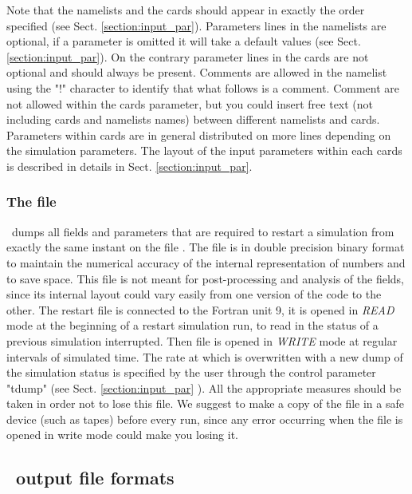 Note that the namelists and the cards should appear in exactly the order
specified (see Sect. \ref{section:input_par}). 
Parameters lines in the namelists are optional, if a parameter is omitted
it will take a default values (see Sect. \ref{section:input_par}).
On the contrary parameter lines in the cards are not optional and
should always be present.
Comments are allowed in the namelist using the "!" character to identify 
that what follows is a comment. Comment are not allowed within the cards
parameter, but you could insert free text (not including cards and namelists 
names) between different namelists and cards.
Parameters within cards are in general distributed on more lines depending
on the simulation parameters. The layout of the input parameters 
within each cards is described in details in Sect. \ref{section:input_par}.

\subsubsection{The  file}
\label{section:pdac_res}

\PDAC\ dumps all fields and parameters that are required to restart a 
simulation from exactly the same instant on the file .
The file is in double precision binary format to maintain the numerical 
accuracy of the internal representation of numbers and to save space. 
This file is not meant for post-processing
and analysis of the fields, since its internal layout could
vary easily from one version of the code to the other.
The restart file is connected to the Fortran unit 9, it is
opened in {\it READ} mode at the beginning of a restart simulation run,
to read in the status of a previous simulation interrupted.
Then  file is opened in {\it WRITE} mode at regular intervals
of simulated time. The rate at which  is overwritten
with a new dump of the simulation status is specified by
the user through the control parameter "tdump" 
(see Sect. \ref{section:input_par} ).
All the appropriate measures should be taken in order
not to lose this file. We suggest to make a copy of the file in 
a safe device (such as tapes) before every run, since any error occurring
when the file is opened in write mode could make you losing it.

\subsection{\PDAC\ output file formats}
\label{section:output_files}

